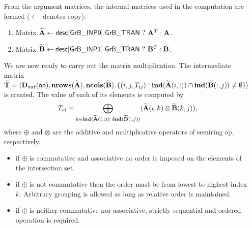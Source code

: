 


From the argument matrices, the internal matrices used in 
the computation are formed ($\leftarrow$ denotes copy): 
\begin{enumerate}

	\item Matrix ${\bf \widetilde{A}} \leftarrow
    {\sf desc[GrB\_INP0].GrB\_TRAN} \ ? \ {\bf A}^T : {\bf A}$.

	\item Matrix ${\bf \widetilde{B}} \leftarrow
    {\sf desc[GrB\_INP1].GrB\_TRAN} \ ? \ {\bf B}^T : {\bf B}$.
\end{enumerate}


We are now ready to carry out the matrix multiplication.
The intermediate matrix \\
${\bf \widetilde{T}} = \langle
\mbox{$\mathbf{D}_{out}$}({\sf op}), \bold{nrows}({\bf \widetilde{A}}), \bold{ncols}({\bf \widetilde{B}}),
\{(i,j,T_{ij}) : \bold{ind}({\bf \widetilde{A}}(i,:)) \cap
\bold{ind}({\bf \widetilde{B}}(:,j)) \neq \emptyset \} \rangle$
is created.  The value of each of its elements is computed by 
\[T_{ij} = \bigoplus_{k \in \bold{ind}({\bf \widetilde{A}}(i,:)) \cap
\bold{ind}({\bf \widetilde{B}}(:,j))} ({\bf \widetilde{A}}(i,k)
\otimes {\bf \widetilde{B}}(k,j)),\] where $\oplus$ and $\otimes$
are the additive and multiplicative operators of semiring {\sf op},
respectively.

\begin{itemize}
\item if $\oplus$ is commutative and associative no order is imposed on the elements of the intersection set.
\item if $\oplus$ is not commutative then the order must be from lowest to highest index $k$. Arbitrary grouping is allowed as long as relative order is maintained.
\item if $\oplus$ is neither commutative nor associative, strictly sequential and ordered operation is required.
\end{itemize}

